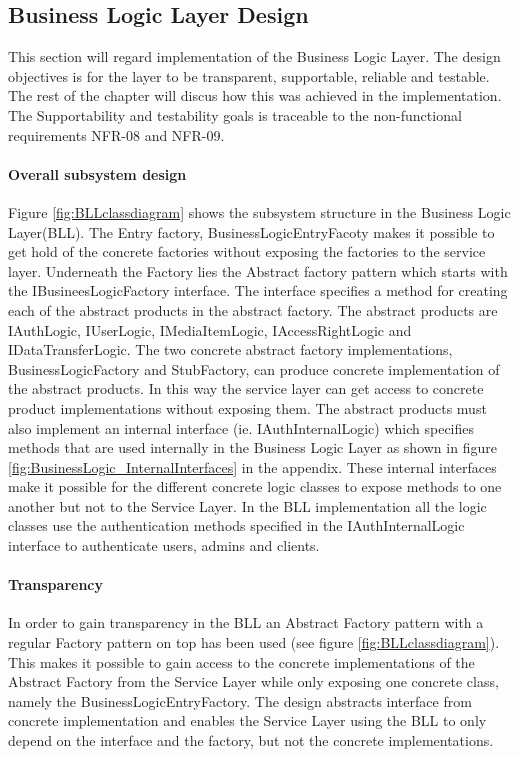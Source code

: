 \documentclass[../report.tex]{subfiles}
\begin{document}
\graphicspath{{img/}{../img/}}

\subsection{Business Logic Layer Design}

This section will regard implementation of the Business Logic Layer. The design objectives is for the layer to be transparent, supportable, reliable and testable. The rest of the chapter will discus how this was achieved in the implementation. The Supportability and testability goals is traceable to the non-functional requirements NFR-08 and NFR-09.

\paragraph{Overall subsystem design}
Figure \ref{fig:BLLclassdiagram} shows the subsystem structure in the Business Logic Layer(BLL). The Entry factory, BusinessLogicEntryFacoty makes it possible to get hold of the concrete factories without exposing the factories to the service layer. Underneath the Factory lies the Abstract factory pattern which starts with the IBusineesLogicFactory interface. The interface specifies a method for creating each of the abstract products in the abstract factory. The abstract products are IAuthLogic, IUserLogic, IMediaItemLogic, IAccessRightLogic and IDataTransferLogic. The two concrete abstract factory implementations, BusinessLogicFactory and StubFactory, can produce concrete implementation of the abstract products. In this way the service layer can get access to concrete product implementations without exposing them. The abstract products must also implement an internal interface (ie. IAuthInternalLogic) which specifies methods that are used internally in the Business Logic Layer as shown in figure \ref{fig:BusinessLogic_InternalInterfaces} in the appendix. These internal interfaces make it possible for the different concrete logic classes to expose methods to one another but not to the Service Layer. In the BLL implementation all the logic classes use the authentication methods specified in the IAuthInternalLogic interface to authenticate users, admins and clients.

\paragraph{Transparency} 
In order to gain transparency in the BLL an Abstract Factory pattern with a regular Factory pattern on top has been used (see figure \ref{fig:BLLclassdiagram}). This makes it possible to gain access to the concrete implementations of the Abstract Factory from the Service Layer while only exposing one concrete class, namely the BusinessLogicEntryFactory. The design abstracts interface from concrete implementation and enables the Service Layer using the BLL to only depend on the interface and the factory, but not the concrete implementations.
\end{document}
